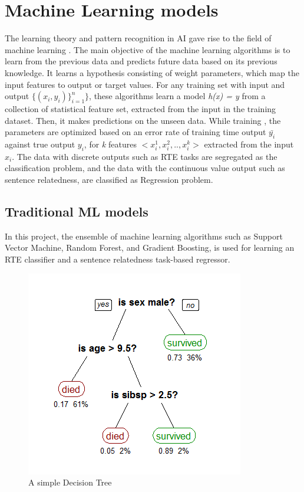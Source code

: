 \documentclass[12pt]{report} %
\begin{document}
\section{Machine Learning models}

The learning theory and pattern recognition in AI gave rise to the field of machine learning \citep{jurafsky2014speech}. The main objective of the machine learning algorithms is to learn from the previous data and predicts future data based on its previous knowledge. It learns a hypothesis consisting of weight parameters, which map the input features to output or target values. For any training set with input and output $\{(x_{i},y_{i})\}_{i=1}^{n}\}$, these algorithms learn a model \textit{h(x) = y} from a collection of statistical feature set, extracted from the input in the training dataset. Then, it makes predictions on the unseen data.  While training , the parameters are optimized based on an error rate of training time output $\bar{y_{i}}$ against true output $y_{i}$, for \textit{k} features $<x^{1}_{i},x^{2}_{i},..,x^{k}_{i}>$ extracted from the input $x_{i}$. The data with discrete outputs such as RTE tasks are segregated as the classification problem, and  the data with the continuous value output such as sentence relatedness, are classified as Regression problem. 

\subsection{Traditional ML models}

In this project, the ensemble of machine learning algorithms such as Support Vector Machine, Random Forest, and Gradient Boosting, is used for learning an RTE classifier and a sentence relatedness task-based regressor. 

\begin{figure}[!tbp]
	\centering
	\caption{A simple Decision Tree}
	\label{tree}
	\includegraphics[scale=0.50]{image/tree.png}
\end{figure}
\end{document}
